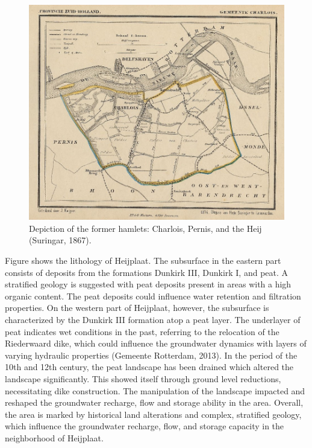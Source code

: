 \begin{figure}[htbp]
    \centering
    \includegraphics[width=0.50\linewidth]{figures/heij/charloisdeheij.jpeg}
    \caption{Depiction of the former hamlets: Charlois, Pernis, and the Heij (Suringar, 1867).}
    \label{histheij}
\end{figure}
Figure  shows the lithology of Heijplaat. The subsurface in the eastern part consists of deposits from the formations Dunkirk III, Dunkirk I, and peat. A stratified geology is suggested with peat deposits present in areas with a high organic content. The peat deposits could influence water retention and filtration properties. On the western part of Heijplaat, however, the subsurface is characterized by the Dunkirk III formation atop a peat layer. The underlayer of peat indicates wet conditions in the past, referring to the relocation of the Riederwaard dike, which could influence the groundwater dynamics with layers of varying hydraulic properties (Gemeente Rotterdam, 2013). In the period of the 10th and 12th century, the peat landscape has been drained which altered the landscape significantly. This showed itself through ground level reductions, necessitating dike construction. The manipulation of the landscape impacted and reshaped the groundwater recharge, flow and storage ability in the area. Overall, the area is marked by historical land alterations and complex, stratified geology, which influence the groundwater recharge, flow, and storage capacity in the neighborhood of Heijplaat. 

